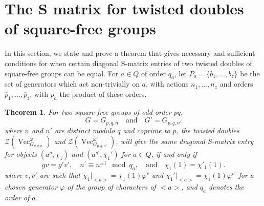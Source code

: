 \documentclass[11pt]{book}
\newtheorem{theorem}{Theorem}[section]
\theoremstyle{Rem}
\theoremstyle{definition}
\numberwithin{equation}{section}
\newcommand\Vect{\operatorname{Vec}}
\newcommand\CTR{\mathcal Z}
\newcommand{\pb}{\bar{p}}
\newcommand{\qb}{q_a}
\begin{document}
\section{The S matrix for twisted doubles of square-free groups}
In this section, we state and prove a theorem that gives necessary and sufficient conditions for when certain diagonal S-matrix entries of two twisted doubles of square-free groups can be equal. For $a\in Q$ of order $q_a$, let $P_a = \{b_1,\dots,b_z\}$  be the set of generators which act non-trivially on $a$, with actions $n_1,\dots, n_z$ and orders $\pb_1,..., \pb_z$, with $p_a$ the product of these orders. 
\begin{theorem}
For two square-free groups of odd order $pq$, \begin{equation}
	G = G_{p,q,n} \quad \text{and} \quad G'=G_{p,q,n'}
\end{equation} where $n$ and $n'$ are distinct modulo $q$ and coprime to $p$, the twisted doubles $\CTR(\Vect_{G_{p,q,n}}^\omega)$ and $\CTR(\Vect_{G_{p,q,n'}}^{\omega'})$, will give the same diagonal S-matrix entry for objects $(a^g, \chi_1)$ and $(a^{g'}, \chi_1')$ for $a \in Q$,  if and only if \begin{equation}
	gv = g'v', \quad n^{\prime} \equiv  n^{\pm 1} \mod \qb, \quad \text{and}\quad \chi_1(1)=\chi'_1(1).
\end{equation}
where $v,v'$ are such that $\chi_1|_{<a>} = \chi_1(1)\varphi^v$ and $\chi_1'|_{<a>}= \chi_1(1)\varphi^{v'}$ for a chosen generator $\varphi$ of the group of characters of $<a>$, and $q_a$ denotes the order of $a$.
\end{theorem}
\end{document}
